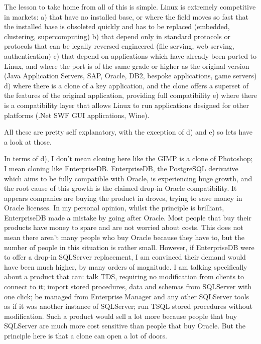 \documentclass{memoir}
\begin{document}
The lesson to take home from all of this is simple. Linux is extremely
competitive in markets: a) that have no installed base, or where the
field moves so fast that the installed base is obsoleted quickly and
has to be replaced (embedded, clustering, supercomputing) b) that
depend only in standard protocols or protocols that can be legally
reversed engineered (file serving, web serving, authentication) c)
that depend on applications which have already been ported to Linux,
and where the port is of the same grade or higher as the original
version (Java Application Servers, SAP, Oracle, DB2, bespoke
applications, game servers) d) where there is a clone of a key
application, and the clone offers a superset of the features of the
original application, providing full compatibility e) where there is a
compatibility layer that allows Linux to run applications designed for
other platforms (.Net SWF GUI applications, Wine).

All these are pretty self explanatory, with the exception of d) and e)
so lets have a look at those.

In terms of d), I don't mean cloning here like the GIMP is a clone of
Photoshop; I mean cloning like EnterpriseDB. EnterpriseDB, the
PostgreSQL derivative which aims to be fully compatible with Oracle,
is experiencing huge growth, and the root cause of this growth is the
claimed drop-in Oracle compatibility. It appears companies are buying
the product in droves, trying to save money in Oracle licenses. In my
personal opinion, whilst the principle is brilliant, EnterpriseDB made
a mistake by going after Oracle. Most people that buy their products
have money to spare and are not worried about costs. This does not
mean there aren't many people who buy Oracle because they have to, but
the number of people in this situation is rather small. However, if
EnterpriseDB were to offer a drop-in SQLServer replacement, I am
convinced their demand would have been much higher, by many orders of
magnitude. I am talking specifically about a product that can: talk
TDS, requiring no modification from clients to connect to it; import
stored procedures, data and schemas from SQLServer with one click; be
managed from Enterprise Manager and any other SQLServer tools as if it
was another instance of SQLServer; run TSQL stored procedures without
modification. Such a product would sell a lot more because people that
buy SQLServer are much more cost sensitive than people that buy
Oracle. But the principle here is that a clone can open a lot of
doors.
\end{document}
